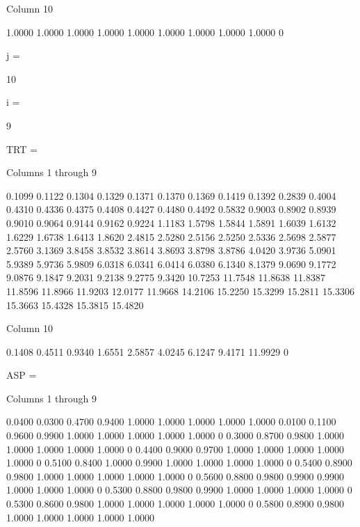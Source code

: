   Column 10

    1.0000
    1.0000
    1.0000
    1.0000
    1.0000
    1.0000
    1.0000
    1.0000
    1.0000
         0


j =

    10


i =

     9


TRT =

  Columns 1 through 9

    0.1099    0.1122    0.1304    0.1329    0.1371    0.1370    0.1369    0.1419    0.1392
    0.2839    0.4004    0.4310    0.4336    0.4375    0.4408    0.4427    0.4480    0.4492
    0.5832    0.9003    0.8902    0.8939    0.9010    0.9064    0.9144    0.9162    0.9224
    1.1183    1.5798    1.5844    1.5891    1.6039    1.6132    1.6229    1.6738    1.6413
    1.8620    2.4815    2.5280    2.5156    2.5250    2.5336    2.5698    2.5877    2.5760
    3.1369    3.8458    3.8532    3.8614    3.8693    3.8798    3.8786    4.0420    3.9736
    5.0901    5.9389    5.9736    5.9809    6.0318    6.0341    6.0414    6.0380    6.1340
    8.1379    9.0690    9.1772    9.0876    9.1847    9.2031    9.2138    9.2775    9.3420
   10.7253   11.7548   11.8638   11.8387   11.8596   11.8966   11.9203   12.0177   11.9668
   14.2106   15.2250   15.3299   15.2811   15.3306   15.3663   15.4328   15.3815   15.4820

  Column 10

    0.1408
    0.4511
    0.9340
    1.6551
    2.5857
    4.0245
    6.1247
    9.4171
   11.9929
         0


ASP =

  Columns 1 through 9

    0.0400    0.0300    0.4700    0.9400    1.0000    1.0000    1.0000    1.0000    1.0000
    0.0100    0.1100    0.9600    0.9900    1.0000    1.0000    1.0000    1.0000    1.0000
         0    0.3000    0.8700    0.9800    1.0000    1.0000    1.0000    1.0000    1.0000
         0    0.4400    0.9000    0.9700    1.0000    1.0000    1.0000    1.0000    1.0000
         0    0.5100    0.8400    1.0000    0.9900    1.0000    1.0000    1.0000    1.0000
         0    0.5400    0.8900    0.9800    1.0000    1.0000    1.0000    1.0000    1.0000
         0    0.5600    0.8800    0.9800    0.9900    0.9900    1.0000    1.0000    1.0000
         0    0.5300    0.8800    0.9800    0.9900    1.0000    1.0000    1.0000    1.0000
         0    0.5300    0.8600    0.9800    1.0000    1.0000    1.0000    1.0000    1.0000
         0    0.5800    0.8900    0.9800    1.0000    1.0000    1.0000    1.0000    1.0000

